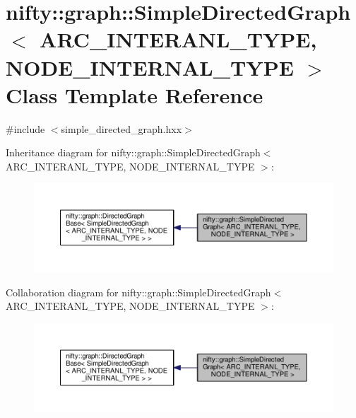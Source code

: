 \hypertarget{classnifty_1_1graph_1_1SimpleDirectedGraph}{}\section{nifty\+:\+:graph\+:\+:Simple\+Directed\+Graph$<$ A\+R\+C\+\_\+\+I\+N\+T\+E\+R\+A\+N\+L\+\_\+\+T\+Y\+P\+E, N\+O\+D\+E\+\_\+\+I\+N\+T\+E\+R\+N\+A\+L\+\_\+\+T\+Y\+P\+E $>$ Class Template Reference}
\label{classnifty_1_1graph_1_1SimpleDirectedGraph}


{\ttfamily \#include $<$simple\+\_\+directed\+\_\+graph.\+hxx$>$}



Inheritance diagram for nifty\+:\+:graph\+:\+:Simple\+Directed\+Graph$<$ A\+R\+C\+\_\+\+I\+N\+T\+E\+R\+A\+N\+L\+\_\+\+T\+Y\+P\+E, N\+O\+D\+E\+\_\+\+I\+N\+T\+E\+R\+N\+A\+L\+\_\+\+T\+Y\+P\+E $>$\+:\nopagebreak
\begin{figure}[H]
\begin{center}
\leavevmode
\includegraphics[width=350pt]{classnifty_1_1graph_1_1SimpleDirectedGraph__inherit__graph}
\end{center}
\end{figure}


Collaboration diagram for nifty\+:\+:graph\+:\+:Simple\+Directed\+Graph$<$ A\+R\+C\+\_\+\+I\+N\+T\+E\+R\+A\+N\+L\+\_\+\+T\+Y\+P\+E, N\+O\+D\+E\+\_\+\+I\+N\+T\+E\+R\+N\+A\+L\+\_\+\+T\+Y\+P\+E $>$\+:\nopagebreak
\begin{figure}[H]
\begin{center}
\leavevmode
\includegraphics[width=350pt]{classnifty_1_1graph_1_1SimpleDirectedGraph__coll__graph}
\end{center}
\end{figure}

